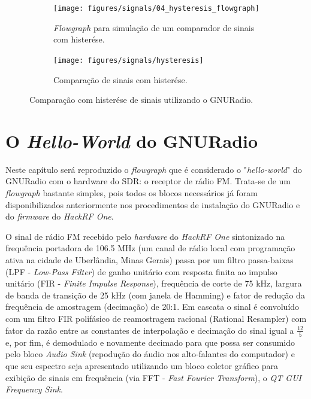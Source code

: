 \documentclass[
  12pt,				%
  openright,			%
  twoside,			%
  a4paper,			%
  english,			%
  french,				%
  spanish,			%
  brazil,				%
  ]{abntex2}
\begin{document}
\begin{figure}[!htb]
  \centering
  \begin{subfigure}[b]{\linewidth}
    \centering
    \caption{\textit{Flowgraph} para simulação de um comparador de sinais com histerése.}
    \texttt{[image: figures/signals/04\_hysteresis\_flowgraph]}
    \label{fig:gnuradio_hysteresis_flowgraph}
  \end{subfigure}

  \begin{subfigure}[b]{\linewidth}
    \centering
    \caption{Comparação de sinais com histerése.}
    \texttt{[image: figures/signals/hysteresis]}
    \label{fig:gnuradio_hysteresis}
  \end{subfigure}
  \caption{Comparação com histerése de sinais utilizando o GNURadio.}
  \label{fig:gnuradio_signals}
\end{figure}

\chapter{O \textit{Hello-World} do GNURadio}

Neste capítulo será reproduzido o \textit{flowgraph} que é considerado o "\textit{hello-world}" do GNURadio com o hardware do SDR: o receptor de rádio FM. Trata-se de um \textit{flowgraph}
bastante simples, pois todos os blocos necessários já foram disponibilizados anteriormente nos procedimentos de instalação do GNURadio e do \textit{firmware} do \textit{HackRF One}.

O sinal de rádio FM recebido pelo \textit{hardware} do \textit{HackRF One} sintonizado na frequência portadora de 106.5 MHz (um canal de rádio local com programação ativa na cidade
de Uberlândia, Minas Gerais) passa por um filtro passa-baixas (LPF - \textit{Low-Pass Filter}) de ganho unitário com resposta finita ao impulso unitário
(FIR - \textit{Finite Impulse Response}), frequência de corte de 75 kHz, largura de banda de transição de 25 kHz (com janela de Hamming) e fator de redução da frequência de amostragem
(decimação) de 20:1. Em cascata o sinal é convoluído com um filtro FIR polifásico de reamostragem racional (Rational Resampler) com fator da razão entre as constantes de interpolação
e decimação do sinal igual a $\frac{12}{5}$ e, por fim, é demodulado e novamente decimado para que possa ser consumido pelo bloco \textit{Audio Sink} (repodução do áudio nos
alto-falantes do computador) e que seu espectro seja apresentado utilizando um bloco coletor gráfico para exibição de sinais em frequência (via FFT - \textit{Fast Fourier Transform}),
o \textit{QT GUI Frequency Sink}.
\end{document}
